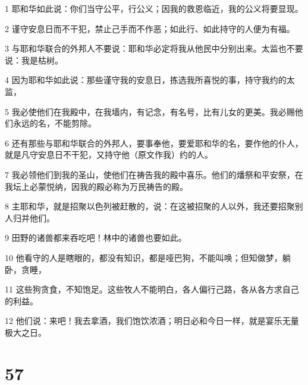 \par 1 耶和华如此说：你们当守公平，行公义；因我的救恩临近，我的公义将要显现。
\par 2 谨守安息日而不干犯，禁止己手而不作恶；如此行、如此持守的人便为有福。
\par 3 与耶和华联合的外邦人不要说：耶和华必定将我从他民中分别出来。太监也不要说：我是枯树。
\par 4 因为耶和华如此说：那些谨守我的安息日，拣选我所喜悦的事，持守我约的太监，
\par 5 我必使他们在我殿中，在我墙内，有记念，有名号，比有儿女的更美。我必赐他们永远的名，不能剪除。
\par 6 还有那些与耶和华联合的外邦人，要事奉他，要爱耶和华的名，要作他的仆人，就是凡守安息日不干犯，又持守他（原文作我）约的人。
\par 7 我必领他们到我的圣山，使他们在祷告我的殿中喜乐。他们的燔祭和平安祭，在我坛上必蒙悦纳，因我的殿必称为万民祷告的殿。
\par 8 主耶和华，就是招聚以色列被赶散的，说：在这被招聚的人以外，我还要招聚别人归并他们。
\par 9 田野的诸兽都来吞吃吧！林中的诸兽也要如此。
\par 10 他看守的人是瞎眼的，都没有知识，都是哑巴狗，不能叫唤；但知做梦，躺卧，贪睡，
\par 11 这些狗贪食，不知饱足。这些牧人不能明白，各人偏行己路，各从各方求自己的利益。
\par 12 他们说：来吧！我去拿酒，我们饱饮浓酒；明日必和今日一样，就是宴乐无量极大之日。

\chapter{57}


